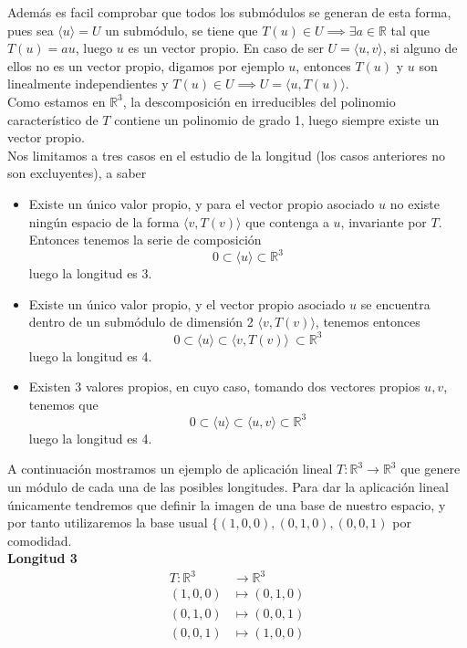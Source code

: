 Además es facil comprobar que todos los submódulos se generan de
esta forma, pues sea \(\langle u \rangle = U\) un submódulo, se tiene que \(T(u)
\in U \implies \exists a \in \mathbb{R}\) tal que \(T(u) = au\), luego \(u\) es un
vector propio. En caso de ser \(U = \langle u , v \rangle\), si alguno de ellos
no es un vector propio, digamos por ejemplo \(u\), entonces \(T(u)\) y \(u\) son linealmente independientes y
\(T(u) \in U \implies U = \langle u , T(u) \rangle\).\\

Como estamos en \(\mathbb{R}^3\), la descomposición en irreducibles del
polinomio característico de \(T\) contiene un polinomio de grado 1, luego
siempre existe un vector propio.\\

Nos limitamos a tres casos en el estudio de la longitud (los casos
anteriores no son excluyentes), a saber
\begin{itemize}
\item Existe un único valor propio, y para el vector propio asociado \(u\)  no existe ningún espacio de la forma
  \(\langle v, T(v)\rangle \) que contenga a \(u\), invariante por \(T\). Entonces tenemos la serie de composición
  \[
    0 \subset \langle u \rangle \subset \mathbb{R}^3
  \]
  luego la longitud es 3.
\item Existe un único valor propio, y el vector propio asociado \(u\) se encuentra dentro de un submódulo de
  dimensión 2 \(\langle v, T(v) \rangle\), tenemos entonces
  \[
    0 \subset \langle u \rangle \subset \langle v, T(v) \rangle\ \subset \mathbb{R}^3
  \]
  luego la longitud es 4.
\item Existen 3 valores propios, en cuyo caso, tomando dos vectores propios \(u,v\), tenemos que
\[
0 \subset \langle u \rangle \subset \langle u, v \rangle \subset \mathbb{R}^3
\]
luego la longitud es 4.
\end{itemize}

A continuación mostramos un ejemplo de aplicación lineal \(T:\mathbb{R}^3 \rightarrow \mathbb{R}^3\) que genere un módulo de cada una de las posibles longitudes.
Para dar la aplicación lineal únicamente tendremos que definir la imagen de una base de nuestro espacio, y por tanto utilizaremos la base usual
\(\{(1,0,0), (0,1,0), (0,0,1)\) por comodidad.\\

\textbf{Longitud 3}%
\[
\begin{aligned}
  T:\mathbb{R}^3 &\rightarrow \mathbb{R}^3\\
  (1,0,0) &\mapsto (0,1,0)\\
  (0,1,0) &\mapsto (0,0,1)\\
  (0,0,1) &\mapsto (1,0,0)
\end{aligned}
\]

